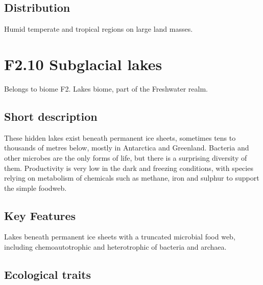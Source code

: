 \documentclass[
  letterpaper,
  DIV=11,
  numbers=noendperiod]{scrartcl}
\begin{document}
\subsection{Distribution}\label{distribution-116}

Humid temperate and tropical regions on large land masses.

\section{F2.10 Subglacial lakes}\label{f2.10-subglacial-lakes-1}

Belongs to biome F2. Lakes biome, part of the Freshwater realm.

\subsection{Short description}\label{short-description-117}

These hidden lakes exist beneath permanent ice sheets, sometimes tens to
thousands of metres below, mostly in Antarctica and Greenland. Bacteria
and other microbes are the only forms of life, but there is a surprising
diversity of them. Productivity is very low in the dark and freezing
conditions, with species relying on metabolism of chemicals such as
methane, iron and sulphur to support the simple foodweb.

\subsection{Key Features}\label{key-features-117}

Lakes beneath permanent ice sheets with a truncated microbial food web,
including chemoautotrophic and heterotrophic of bacteria and archaea.

\subsection{Ecological traits}\label{ecological-traits-117}
\end{document}
